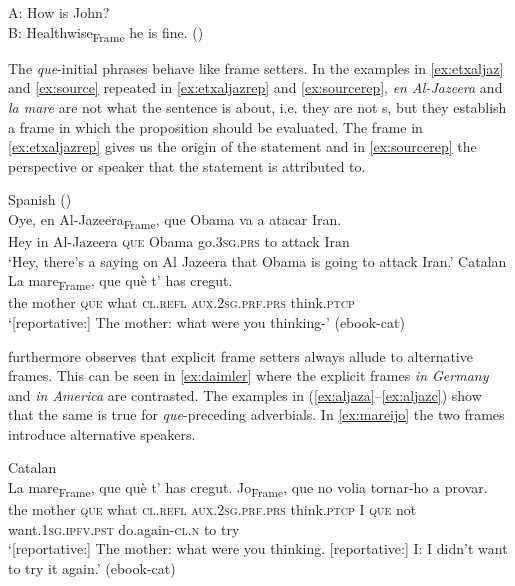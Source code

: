 \ea\label{ex:healthwise} A: How is John?\\
	B:
	{\ob}Healthwise{\cb}\textsubscript{Frame} he is fine. (\citealt[269: ex 47]{Krifka2008})
\z


The \emph{que}-initial phrases behave like frame setters. In the examples in \eqref{ex:etxaljaz} and \eqref{ex:source} repeated in \eqref{ex:etxaljazrep} and \eqref{ex:sourcerep},  \emph{en Al-Jazeera} and \emph{la mare} are not what the sentence is about, i.e. they are not s, but they establish a frame in which the proposition should be evaluated. The frame in \eqref{ex:etxaljazrep} gives us the origin  of the statement and in  \eqref{ex:sourcerep} the perspective or speaker that the statement is attributed to.

\ea\label{ex:aljazrepall}
\ea\label{ex:etxaljazrep}
 Spanish (\citealt[98: ex 11]{Etxepare2013})\\ 
\gll Oye, {\ob}en Al-Jazeera{\cb}\textsubscript{Frame}, que Obama va a atacar Iran. \\
		Hey  in Al-Jazeera \textsc{que} Obama go.\textsc{3sg.prs} to attack Iran\\
		\glt `Hey, there’s a saying on Al Jazeera that Obama is going to attack Iran.' 
		\ex \label{ex:sourcerep}  
		Catalan\\ 
		      \gll  {\ob}La mare{\cb}\textsubscript{Frame}, que què t' has cregut. \\
		the mother \textsc{que} what \textsc{cl.refl} \textsc{aux.2sg.prf.prs} think.\textsc{ptcp}\\
		\glt `[reportative:] The mother: what were you thinking-’ (ebook-cat)
	\z
\z


\citet{Krifka2008} furthermore observes that explicit frame setters always allude to alternative frames. This can be seen in \eqref{ex:daimler} where the explicit frames \emph{in Germany} and \emph{in America} are contrasted.  The examples in (\ref{ex:aljaza}--\ref{ex:aljazc}) show that the same is true for \emph{que}-preceding adverbials.  In \eqref{ex:mareijo} the two frames introduce alternative speakers.\largerpage

\ea\label{ex:mareijo}
Catalan\\ 
\gll {\ob}La mare{\cb}\textsubscript{Frame}, que què t’ has cregut. {\ob}Jo{\cb}\textsubscript{Frame}, que no volia tornar-ho a provar. \\
	the mother \textsc{que} what \textsc{cl.refl} \textsc{aux.2sg.prf.prs} think.\textsc{ptcp} I \textsc{que} not want.\textsc{1sg.ipfv.pst} do.again-\textsc{cl.n} to try\\
	\glt `[reportative:] The mother: what were you thinking. [reportative:] I: I didn't want to try it again.’ (ebook-cat)
\z


